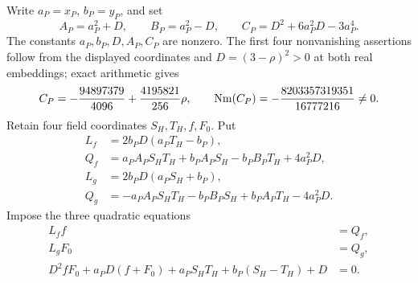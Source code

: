 \documentclass[11pt,a4paper]{article}
\begin{document}
Write $a_P=x_P$, $b_P=y_P$, and set
\[
 A_P=a_P^2+D,\qquad B_P=a_P^2-D,\qquad
 C_P=D^2+6a_P^2D-3a_P^4.
\]
The constants $a_P,b_P,D,A_P,C_P$ are nonzero. The first four
nonvanishing assertions follow from the displayed coordinates and
$D=(3-\rho)^2>0$ at both real embeddings; exact arithmetic gives
\[
 C_P=-\frac{94897379}{4096}+\frac{4195821}{256}\rho,
 \qquad \operatorname{Nm}(C_P)=-\frac{8203357319351}{16777216}\ne0.
\]
Retain four field coordinates $S_H,T_H,f,F_0$. Put
\begin{align*}
 L_f&=2b_PD(a_PT_H-b_P),\\
 Q_f&=a_PA_P S_H T_H+b_PA_P S_H-b_PB_PT_H+4a_P^2D,\\
 L_g&=2b_PD(a_P S_H+b_P),\\
 Q_g&=-a_PA_P S_H T_H-b_PB_P S_H+b_PA_PT_H-4a_P^2D.
\end{align*}
Impose the three quadratic equations
\begin{equation}\label{eq:Hchart}
 \begin{split}
 L_ff&=Q_f,\\
 L_gF_0&=Q_g,\\
 D^2fF_0+a_PD(f+F_0)+a_PS_HT_H+b_P(S_H-T_H)+D&=0.
 \end{split}
\end{equation}
\end{document}
